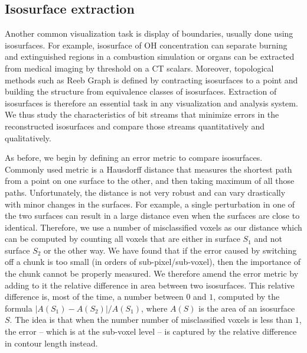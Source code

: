 \subsection{Isosurface extraction}\label{sec:isocontour}
Another common visualization task is display of boundaries, usually done using isosurfaces. For
example, isosurface of OH concentration can separate burning and extinguished regions in a
combustion simulation or organs can be extracted from medical imaging by threshold on a CT scalars.
Moreover, topological methods such as Reeb Graph is defined by contracting isosurfaces to a point
and building the structure from equivalence classes of isosurfaces. Extraction of isosurfaces is
therefore an essential task in any visualization and analysis system. We thus study the
characteristics of bit streams that minimize errors in the reconstructed isosurfaces and compare
those streams quantitatively and qualitatively.

 As before, we begin by defining an error metric to compare isosurfaces. Commonly used metric
is a Hausdorff distance that measures the shortest path from a point on one surface to the other,
and then taking maximum of all those paths. Unfortunately, the distance is not very robust and can
vary drastically with minor changes in the surfaces. For example, a single perturbation in one of
the two surfaces can result in a large distance even when the surfaces are close to identical.
Therefore, we use a number of misclassified voxels as our distance which can be computed by counting
all voxels that are either in surface $S_1$ and not surface $S_2$ or the other way. We have found that if the error caused by switching off a chunk is too small
(in orders of sub-pixel/sub-voxel), then the importance of the chunk cannot be properly measured. We
therefore amend the error metric by adding to it the relative difference in area between two
isosurfaces. This relative difference is, most of the time, a number between $0$ and $1$, computed
by the formula $|A(S_1)-A(S_2)|/A(S_1)$, where $A(S)$ is the area of an isosurface $S$. The idea is
that when the number number of misclassified voxels is less than $1$, the error -- which is at the
sub-voxel level -- is captured by the relative difference in contour length instead.

